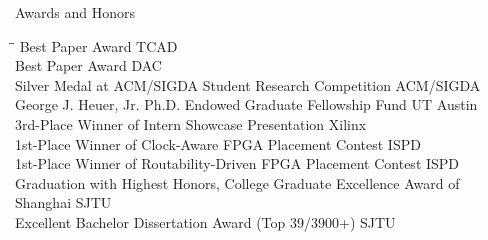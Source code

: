 
\begin{rSection}{Awards and Honors}
\begin{tabbing}
\hspace{5.50in}\= \hspace{1.00in}\= \kill
Best Paper Award \> TCAD  \\
Best Paper Award \> DAC  \\
Silver Medal at ACM/SIGDA Student Research Competition \> ACM/SIGDA  \\
George J. Heuer, Jr. Ph.D. Endowed Graduate Fellowship Fund \> UT Austin  \\
3rd-Place Winner of Intern Showcase Presentation \> Xilinx  \\
1st-Place Winner of Clock-Aware FPGA Placement Contest \> ISPD  \\
1st-Place Winner of Routability-Driven FPGA Placement Contest \> ISPD  \\
Graduation with Highest Honors, College Graduate Excellence Award of Shanghai \> SJTU  \\
Excellent Bachelor Dissertation Award (Top 39/3900+) \> SJTU  \\

\end{tabbing}
\end{rSection}

